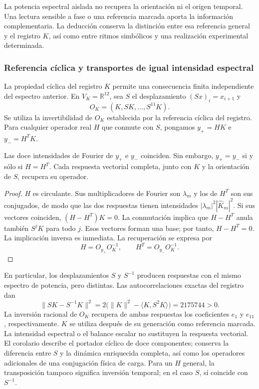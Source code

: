 La potencia espectral aislada no recupera la orientación ni el origen
temporal. Una lectura sensible a fase o una referencia marcada aporta
la información complementaria. La deducción conserva la distinción entre
esa referencia general y el registro $K$, así como entre ritmos simbólicos
y una realización experimental determinada.

\subsubsection{Referencia cíclica y transportes de igual intensidad espectral}
\label{md:cron:k-ciclico}

La propiedad cíclica del registro $K$ permite una consecuencia finita
independiente del espectro anterior. En $V_K=\mathbb R^{12}$, sea $S$ el
desplazamiento $(Sx)_i=x_{i+1}$ y
\begin{equation}
 O_K=(K,SK,\ldots,S^{11}K).
 \label{md:cron:matriz-ciclica}
\end{equation}
Se utiliza la invertibilidad de $O_K$ establecida por la referencia cíclica
del registro. Para cualquier operador real $H$ que conmute con $S$,
pongamos $y_+=HK$ e $y_-=H^TK$.

\begin{proposition}
\label{md:cron:proposicion-intensidades}
Las doce intensidades de Fourier de $y_+$ e $y_-$ coinciden.
Sin embargo, $y_+=y_-$ si y sólo si $H=H^T$.
Cada respuesta vectorial completa, junto con $K$ y la orientación de $S$,
recupera su operador.
\end{proposition}
\begin{proof}
$H$ es circulante. Sus multiplicadores de Fourier son $\lambda_m$ y los
de $H^T$ son sus conjugados, de modo que las dos respuestas tienen
intensidades $|\lambda_m|^2|\widehat K_m|^2$.
Si sus vectores coinciden, $(H-H^T)K=0$. La conmutación implica que
$H-H^T$ anula también $S^jK$ para todo $j$. Esos vectores forman una base;
por tanto, $H-H^T=0$. La implicación inversa es inmediata.
La recuperación se expresa por
\begin{equation}
 H=O_{y_+}O_K^{-1},\qquad
 H^T=O_{y_-}O_K^{-1}.
 \label{md:cron:restitucion-operador}
\end{equation}
\end{proof}

En particular, los desplazamientos $S$ y $S^{-1}$ producen respuestas con
el mismo espectro de potencia, pero distintas. Las autocorrelaciones exactas
del registro dan
\begin{equation}
 \|SK-S^{-1}K\|^2
 =2\bigl(\|K\|^2-\langle K,S^2K\rangle\bigr)
 =2175744>0.
 \label{md:cron:separacion-desplazamientos}
\end{equation}
La inversión racional de $O_K$ recupera de ambas respuestas los
coeficientes $e_1$ y $e_{11}$, respectivamente. $K$ se utiliza después
de su generación como referencia marcada. La intensidad espectral o el
balance escalar no sustituyen la respuesta vectorial.
El corolario describe el portador cíclico de doce componentes;
conserva la diferencia entre $S$ y la dinámica enriquecida completa,
así como los operadores adicionales de una conjugación física de carga.
Para un $H$ general, la transposición tampoco significa inversión temporal;
en el caso $S$, sí coincide con $S^{-1}$.

